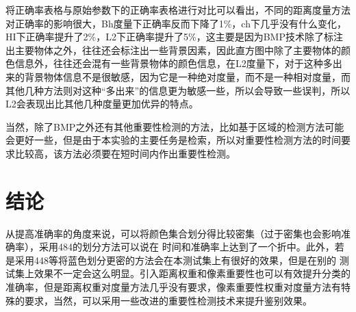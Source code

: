 \documentclass{ctexart}
\begin{document}
将正确率表格与原始参数下的正确率表格进行对比可以看出，不同的距离度量方法对正确率的影响很大，Bh度量下正确率反而下降了1\%，ch下几乎没有什么变化，HI下正确率提升了2\%，L2下正确率提升了5\%，这主要是因为BMP技术除了标注出主要物体之外，往往还会标注出一些背景因素，因此直方图中除了主要物体的颜色信息外，往往还会混有一些背景物体的颜色信息，在L2度量下，对于这种多出来的背景物体信息不是很敏感，因为它是一种绝对度量，而不是一种相对度量，而其他几种方法则对这种“多出来”的信息更为敏感一些，所以会导致一些误判，所以L2会表现出比其他几种度量更加优异的特点。

当然，除了BMP之外还有其他重要性检测的方法，比如基于区域的检测方法可能会更好一些，但是由于本实验的主要任务是检索，所以对重要性检测方法的时间要求比较高，该方法必须要在短时间内作出重要性检测。

\section{结论}
从提高准确率的角度来说，可以将颜色集合划分得比较密集（过于密集也会影响准确率），采用484的划分方法可以说在
时间和准确率上达到了一个折中。此外，若是采用448等将蓝色划分更密的方法会在本测试集上有很好的效果，但是在别的
测试集上效果不一定会这么明显。引入距离权重和像素重要性也可以有效提升分类的准确率，但是距离权重对度量方法几乎没有要求，像素重要性权重对度量方法有特殊的要求，当然，可以采用一些改进的重要性检测技术来提升鉴别效果。
\end{document}
